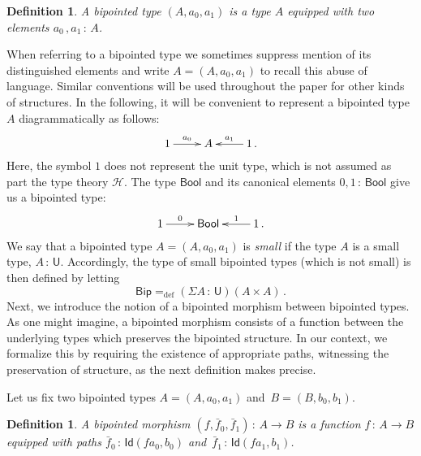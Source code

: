 \documentclass[10pt,a4paper,oneside,reqno]{amsart}
\numberwithin{equation}{section}
\theoremstyle{mythm}
\theoremstyle{mydef}
\newtheorem{definition}[theorem]{Definition}
\theoremstyle{myrmk}
\newcommand{\ie}{\text{i.e.\ }}
\newcommand{\defeq}{=_{\mathrm{def}}}
\newcommand{\co}{\,{:}\,}
\newcommand{\Hint}{\mathcal{H}}
\newcommand{\Bool}{\mathsf{Bool}}
\newcommand{\Id}{\mathsf{Id}}
\newcommand{\U}{\mathsf{U}}
\newcommand{\Bip}{\mathsf{Bip}}
\begin{document}
\begin{definition} \label{thm:bipointedtype}
A \emph{bipointed type} $(A, a_0, a_1)$ is a type $A$ equipped with two elements  $a_0 \, , a_1 \co A$. 
\end{definition}



When referring to a bipointed type we sometimes suppress mention of its distinguished elements and write $A = (A, a_0, a_1)$ to recall this abuse of language. Similar conventions will be used throughout the paper for other kinds of
structures. In the following, it will be convenient to represent a bipointed type~$A$  
diagrammatically as follows:
\[
\xymatrix{
1 \ar[r]^-{a_0}&  A & 1 \ar[l]_-{a_1} \, .}
 \]
Here, the symbol $1$ does not represent the unit type, which is not assumed as part the type theory $\Hint$.
The type $\Bool$ and its canonical elements $0, 1 \co \Bool$ give us a bipointed type:
\[
\xymatrix{
 1 \ar[r]^-{0}&  \Bool  & 1 \ar[l]_-{1} \, . }
 \]
We say that a bipointed type $A = (A, a_0, a_1)$ is \emph{small} if the type $A$ is a small type, \ie $A \co \U$. 
Accordingly, the type of small bipointed types (which is not small) is then defined by letting 
\[
\Bip \defeq (\Sigma A \co \U)( A \times A ) \, .
\]
Next, we introduce the notion of a bipointed morphism between bipointed types. 
As one might imagine, a bipointed morphism consists of a function between the underlying types which preserves
the bipointed structure. In our context, we formalize this by requiring the existence of appropriate paths, witnessing  
the preservation of structure, as the next definition makes precise. 

\medskip

Let us fix two bipointed types $A = (A, a_0, a_1)$ and~$B = (B, b_0, b_1)$. 


\begin{definition} A \emph{bipointed morphism} $(f, \bar{f}_0, \bar{f}_1)  \co A  \to B$
is a function $f \co A \to B$ equipped with paths $\bar{f}_0 \co  \Id(f a_0, b_0)$ 
and~$\bar{f}_1 \co \Id(f a_1, b_1)$.  
\end{definition}
\end{document}
